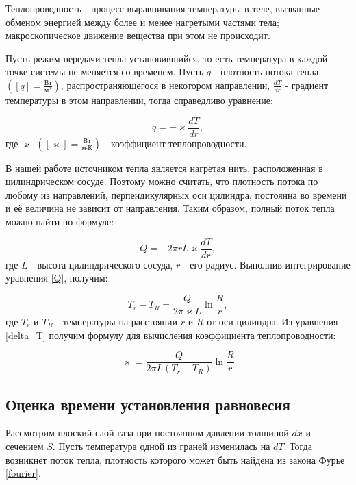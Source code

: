 \documentclass[15pt,a5paper,reqno]{article}
\renewcommand{\kappa}{\varkappa}
\begin{document}
    Теплопроводность - процесс выравнивания температуры в теле, вызванные обменом энергией между более и менее нагретыми частями тела; макроскопическое движение вещества при этом не происходит.
    
    Пусть режим передачи тепла установившийся, то есть температура в каждой точке системы не меняется со временем. Пусть $q$ - плотность потока тепла $\left([q] = \frac{\text{Вт}}{\text{м}^2}\right)$, распространяющегося в некотором направлении, $\frac{dT}{dr}$ - градиент температуры в этом направлении, тогда справедливо уравнение:
    
    \begin{equation}\label{fourier}
        q = -\kappa\frac{dT}{dr},
    \end{equation}
    где $\kappa$ $\left([\kappa] = \frac{\text{Вт}}{\text{м}\cdot\text{К}}\right)$ - коэффициент теплопроводности.
    
    В нашей работе источником тепла является нагретая нить, расположенная в цилиндрическом сосуде. Поэтому можно считать, что плотность потока по любому из направлений, перпендикулярных оси цилиндра, постоянна во времени и её величина не зависит от направления. Таким образом, полный поток тепла можно найти по формуле:
    
    \begin{equation}\label{Q}
        Q = -2\pi rL\kappa\frac{dT}{dr},
    \end{equation}
    где $L$ - высота цилиндрического сосуда, $r$ - его радиус. Выполнив интегрирование уравнения \eqref{Q}, получим:
    
    \begin{equation}\label{delta_T}
        T_r - T_R = \frac{Q}{2\pi\kappa L}\ln{\frac{R}{r}},
    \end{equation}
    где $T_r$ и $T_R$ - температуры на расстоянии $r$ и $R$ от оси цилиндра. Из уравнения \eqref{delta_T} получим формулу для вычисления коэффициента теплопроводности:
    
    \begin{equation}
        \kappa = \frac{Q}{2\pi L(T_r - T_R)}\ln{\frac{R}{r}}
    \end{equation}
    
    \subsection{Оценка времени установления равновесия}
    
    Рассмотрим плоский слой газа при постоянном давлении толщиной $dx$ и сечением $S$. Пусть температура одной из граней изменилась на $dT$. Тогда возникнет поток тепла, плотность которого может быть найдена из закона Фурье \eqref{fourier}. 
    
\end{document}
